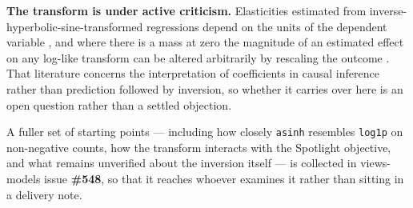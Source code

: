 \textbf{The transform is under active criticism.} Elasticities estimated from
inverse-hyperbolic-sine-transformed regressions depend on the units of the dependent variable
\citep{bellemare2020elasticities}, and where there is a mass at zero the magnitude of an estimated
effect on any log-like transform can be altered arbitrarily by rescaling the outcome \citep{chen2024logs}. That literature concerns the interpretation of coefficients in causal inference rather
than prediction followed by inversion, so whether it carries over here is an open question rather
than a settled objection.

\noindent A fuller set of starting points --- including how closely \texttt{asinh} resembles
\texttt{log1p} on non-negative counts, how the transform interacts with the Spotlight objective,
and what remains unverified about the inversion itself --- is collected in views-models issue
\textbf{\#548}, so that it reaches whoever examines it rather than sitting in a delivery note.
